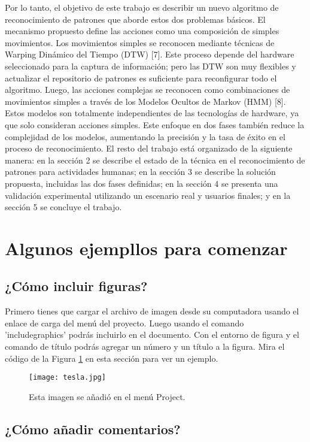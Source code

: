 \documentclass[a4paper]{article}
\begin{document}
Por lo tanto, el objetivo de este trabajo es describir un nuevo algoritmo de reconocimiento de patrones que aborde estos dos problemas básicos. El mecanismo propuesto define las acciones como una composición de simples movimientos. Los movimientos simples se reconocen mediante técnicas de Warping Dinámico del Tiempo (DTW) [7]. Este proceso depende del hardware seleccionado para la captura de información; pero las DTW son muy flexibles y actualizar el repositorio de patrones es suficiente para reconfigurar todo el algoritmo. Luego, las acciones complejas se reconocen como combinaciones de movimientos simples a través de los Modelos Ocultos de Markov (HMM) [8]. Estos modelos son totalmente independientes de las tecnologías de hardware, ya que solo consideran acciones simples. Este enfoque en dos fases también reduce la complejidad de los modelos, aumentando la precisión y la tasa de éxito en el proceso de reconocimiento.
El resto del trabajo está organizado de la siguiente manera: en la sección 2 se describe el estado de la técnica en el reconocimiento de patrones para actividades humanas; en la sección 3 se describe la solución propuesta, incluidas las dos fases definidas; en la sección 4 se presenta una validación experimental utilizando un escenario real y usuarios finales; y en la sección 5 se concluye el trabajo.

\section{Algunos ejempllos para comenzar}

\subsection{¿Cómo incluir figuras?}

Primero tienes que cargar el archivo de imagen desde su computadora usando el enlace de carga del menú del proyecto. Luego usando el comando 'includegraphics' podrás incluirlo en el documento. Con el entorno de figura y el comando de título podrás agregar un número y un título a la figura. Mira el código de la Figura \ref{fig:tesla} en esta sección para ver un ejemplo.

\begin{figure}
\centering
\texttt{[image: tesla.jpg]}
\caption{\label{fig:tesla}Esta imagen se añadió en el menú Project.}
\end{figure}


\subsection{¿Cómo añadir comentarios?}
% 
% 
% 
\end{document}
